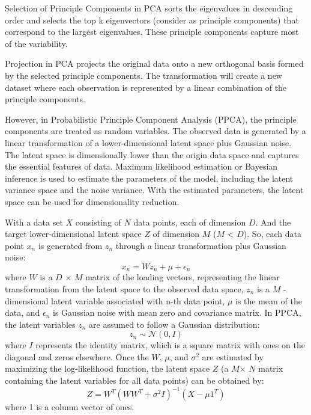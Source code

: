 \documentclass[12pt,a4paper,english
]{tunithesis}
\begin{document}
Selection of Principle Components in PCA sorts the eigenvalues in descending order and selects the top k eigenvectors (consider as principle components) that correspond to the largest eigenvalues. These principle components capture most of the variability.

Projection in PCA projects the original data onto a new orthogonal basis formed by the selected principle components. The transformation will create a new dataset where each observation is represented by a linear combination of the principle components.

However, in Probabilistic Principle Component Analysis (PPCA), the principle components are treated as random variables. The observed data is generated by a linear transformation of a lower-dimensional latent space plus Gaussian noise. The latent space is dimensionally lower than the origin data space and captures the essential features of data. Maximum likelihood estimation or Bayesian inference is used to estimate the parameters of the model, including the latent variance space and the noise variance. With the estimated parameters, the latent space can be used for dimensionality reduction. 

With a data set $X$ consisting of $N$ data points, each of dimension $D$. And the target lower-dimensional latent space $Z$ of dimension $M$ ($M$ < $D$). So, each data point $x_n$ is generated from $z_n$ through a linear transformation plus Gaussian noise:
\begin{equation*}
    {x_n} = {W}{z_n}+{\mu}+{\epsilon _n}
\end{equation*}
where $W$ is a $D$ $\times$ $M$ matrix of the loading vectors, representing the linear transformation from the latent space to the observed data space, $z_n$ is a $M$ -dimensional latent variable associated with n-th data point, $\mu$ is the mean of the data, and $\epsilon _n$ is Gaussian noise with mean zero and covariance matrix.
In PPCA, the latent variables $z_n$ are assumed to follow a Gaussian distribution:
\begin{equation*}
    {z_n} \sim {\mathcal{N}}(0, {I})
\end{equation*}
where $I$ represents the identity matrix, which is a square matrix with ones on the diagonal and zeros elsewhere. Once the $W$, $\mu$, and $\sigma ^2$ are estimated by maximizing the log-likelihood function, the latent space $Z$ (a $M$$\times$ $N$ matrix containing the latent variables for all data points) can be obtained by:
\begin{equation*}
    {Z} = {W^T}{({W}{W^T}+{\sigma ^2}{I})^{-1}}({X}-{\mu}{1^T})
\end{equation*}
where 1 is a column vector of ones.
\end{document}
